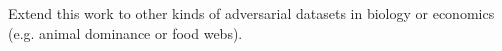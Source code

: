 \documentclass[preview]{standalone}
\begin{document}
Extend this work to other kinds of adversarial datasets in biology or economics (e.g. animal dominance or food webs).\\
\end{document}
